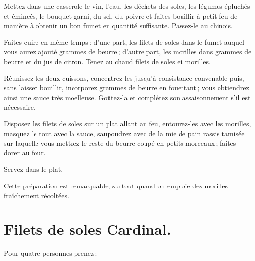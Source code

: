 Mettez dans une casserole le vin, l'eau, les déchets des soles, les légumes
épluchés et émincés, le bouquet garni, du sel, du poivre et faites bouillir
à petit feu de manière à obtenir un bon fumet en quantité suffisante. Passez-le
au chinois.

Faites cuire en même temps : d'une part, les filets de soles dans le fumet
auquel vous aurez ajouté {\mmm} grammes de beurre ; d'autre part, les
morilles dans {\mmm} grammes de beurre et du jus de citron. Tenez au
chaud filets de soles et morilles.

Réunissez les deux cuissons, concentrez-les jusqu'à consistance convenable
puis, sans laisser bouillir, incorporez {\mmm} grammes de beurre en
fouettant ; vous obtiendrez ainsi une sauce très moelleuse. Goûtez-la et
complétez son assaisonnement s'il est nécessaire.

Disposez les filets de soles sur un plat allant au feu, entourez-les avec les
morilles, masquez le tout avec la sauce, saupoudrez avec de la mie de pain
rassis tamisée sur laquelle vous mettrez le reste du beurre coupé en petits
morceaux ; faites dorer au four.

Servez dans le plat.

Cette préparation est remarquable, surtout quand on emploie des morilles
fraîchement récoltées.

\section*{\centering Filets de soles Cardinal.}

Pour quatre personnes prenez :

\medskip

